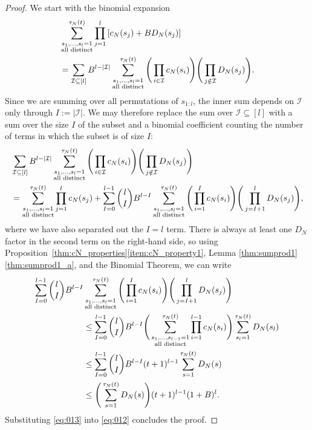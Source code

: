 \documentclass[12pt,authoryear]{article}
\theoremstyle{definition}
\newcommand{\1}[1]{\mathbbm{1}_{#1}}
\begin{document}
\begin{proof}
We start with the binomial expansion
\begin{align}
&\sum_{\substack{ s_1, \dots, s_l =1 \\ \text{all distinct} }}^{\tau_N(t)} 
        \prod_{j=1}^l \left[ c_N(s_j) + B D_N(s_j) \right] \notag \\
&= \sum_{\mathcal{I} \subseteq [l]} B^{l-|\mathcal{I}|}
        \sum_{\substack{ s_1, \dots, s_l =1 \\ \text{all distinct} }}^{\tau_N(t)}
        \Bigg( \prod_{i\in\mathcal{I}} c_N(s_i) \Bigg)
        \Bigg( \prod_{j\notin\mathcal{I}} D_N(s_j) \Bigg). \label{eq:010}
\end{align}
Since we are summing over all permutations of $s_{ 1 : l }$, the inner sum depends on $\mathcal{I}$ only through $I:= |\mathcal{I}|$. We may therefore replace the sum over $\mathcal{I} \subseteq [l]$ with a sum over the size $I$ of the subset and a binomial coefficient counting the number of terms in which the subset is of size $I$:
\begin{align}
&\sum_{\mathcal{I} \subseteq [l]} B^{l-|\mathcal{I}|}
        \sum_{\substack{ s_1, \dots, s_l =1 \\ \text{all distinct} }}^{\tau_N(t)}
        \Bigg( \prod_{i\in\mathcal{I}} c_N(s_i) \Bigg)
        \Bigg( \prod_{j\notin\mathcal{I}} D_N(s_j) \Bigg) \notag\\
&= \sum_{\substack{ s_1, \dots, s_l =1 \\ \text{all distinct} }}^{\tau_N(t)}
        \prod_{j=1}^l c_N(s_j) + \sum_{I=0}^{l-1} \binom{l}{I} B^{l-I} 
        \sum_{\substack{ s_1, \dots, s_l =1 \\ \text{all distinct} }}^{\tau_N(t)}
        \Bigg( \prod_{i=1}^I c_N(s_i) \Bigg) \Bigg( \prod_{j=I+1}^l D_N(s_j) \Bigg), \label{eq:012}
\end{align}
where we have also separated out the $I = l$ term.
There is always at least one $D_N$ factor in the second term on the right-hand side, so using Proposition~\ref{thm:cN_properties}\ref{item:cN_property1}, Lemma \ref{thm:sumprod1}\ref{thm:sumprod1_a}, and the Binomial Theorem, we can write
\begin{align}
\sum_{I=0}^{l-1}\binom{l}{I} B^{l-I} 
        &\sum_{\substack{ s_1, \dots, s_l =1 \\ \text{all distinct} }}^{\tau_N(t)}
        \Bigg( \prod_{i=1}^I c_N(s_i) \Bigg) \Bigg( \prod_{j=I+1}^l D_N(s_j) \Bigg) \notag\\
&\leq \sum_{I=0}^{l-1}\binom{l}{I} B^{l-I} 
        \Bigg( \sum_{\substack{ s_1, \dots, s_{l-1} =1 \\ \text{all distinct} }}^{\tau_N(t)}
        \prod_{i=1}^{l-1} c_N(s_i) \Bigg) 
        \sum_{s_l=1}^{\tau_N(t)} D_N(s_l) \notag\\
&\leq \sum_{I=0}^{l-1}\binom{l}{I} B^{l-I} (t+1)^{l-1}
        \sum_{s=1}^{\tau_N(t)} D_N(s) \notag \\
&\leq \Bigg( \sum_{s=1}^{\tau_N(t)} D_N(s) \Bigg) (t+1)^{l-1} (1+B)^l. \label{eq:013}
\end{align}
Substituting \eqref{eq:013} into \eqref{eq:012} concludes the proof.
\end{proof}
\end{document}
